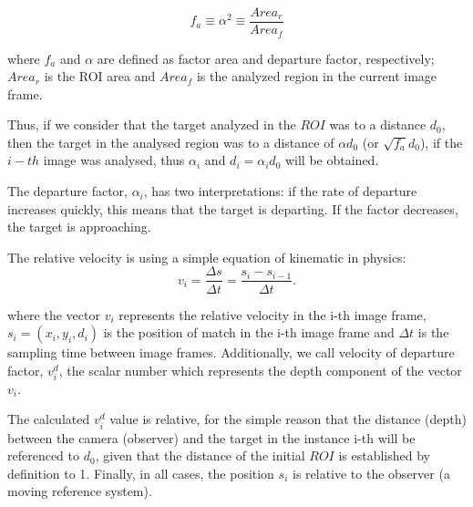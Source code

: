 \begin{equation}\label{eq:relarea}
f_a \equiv \alpha^2 \equiv \frac{Area_r}{Area_f} 
\end{equation}

where $f_a$ and $\alpha$ are defined as factor area and departure factor, 
respectively; $Area_r$ is the ROI area and $Area_f$ 
is the analyzed region in the current image frame. 

Thus, if we consider that the target analyzed in the $ROI$ was to a distance $d_0$,
then the target in the analysed region was to a distance of $\alpha d_0$ (or $\sqrt{f_a} d_0$),
if the $i-th$ image was analysed, thus $\alpha_i$ and $d_i=\alpha_i d_0$ will be obtained.

The departure factor, $\alpha_i$, has two interpretations: if the rate of departure increases quickly, 
this  means that the target is departing. If the factor decreases, the 
target is approaching.

The relative velocity is using a simple equation of kinematic in physics:
\begin{equation}
 v_i = \frac{\Delta s}{\Delta t}= \frac{s_i-s_{i-1}}{\Delta t}.
\end{equation}

where the vector $v_i$ represents the relative velocity in the i-th image frame, 
$s_i=(x_i,y_i,d_i)$ is the position of match in the i-th image frame
and $\Delta t$ is the sampling time between image frames.
Additionally, we call velocity of departure factor, $v^d_i$, 
the scalar number which represents the depth component
of the vector $v_i$.

The calculated  $v^d_i$ value is relative, for the simple reason that the distance (depth) between the 
camera (observer) and the target in the instance i-th will be referenced to $d_0$, 
given that the distance of the initial $ROI$ is established by definition to 1.
Finally, in all cases, the position $s_i$ is relative to the observer (a moving reference system).

